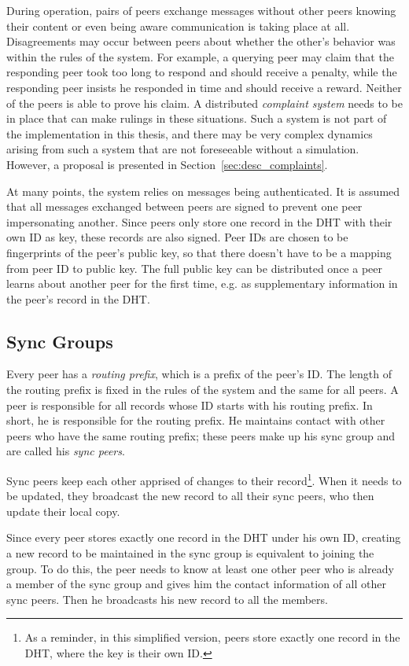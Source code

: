 During operation, pairs of peers exchange messages without other peers knowing
their content or even being aware communication is taking place at all.
Disagreements may occur between peers about whether the other's behavior was
within the rules of the system. For example, a querying peer may claim that the
responding peer took too long to respond and should receive a penalty, while the
responding peer insists he responded in time and should receive a reward.
Neither of the peers is able to prove his claim. A distributed \emph{complaint
system} needs to be in place that can make rulings in these situations. Such a
system is not part of the implementation in this thesis, and there may be very
complex dynamics arising from such a system that are not foreseeable without a
simulation. However, a proposal is presented in
Section~\ref{sec:desc_complaints}.

At many points, the system relies on messages being authenticated. It is assumed
that all messages exchanged between peers are signed to prevent one peer
impersonating another. Since peers only store one record in the DHT with their
own ID as key, these records are also signed. Peer IDs are chosen to be
fingerprints of the peer's public key, so that there doesn't have to be a
mapping from peer ID to public key. The full public key can be distributed once
a peer learns about another peer for the first time, e.g. as supplementary
information in the peer's record in the DHT.

\subsection{Sync Groups}
\label{sec:desc_sync_groups}
Every peer has a \emph{routing prefix}, which is a prefix of the peer's ID. The
length of the routing prefix is fixed in the rules of the system and the same
for all peers. A peer is responsible for all records whose ID starts with his
routing prefix. In short, he is responsible for the routing prefix. He maintains
contact with other peers who have the same routing prefix; these peers make up
his sync group and are called his \emph{sync peers}.

Sync peers keep each other apprised of changes to their record\footnote{As a
reminder, in this simplified version, peers store exactly one record in the DHT,
where the key is their own ID.}. When it needs to be updated, they broadcast the
new record to all their sync peers, who then update their local copy.

Since every peer stores exactly one record in the DHT under his own ID, creating
a new record to be maintained in the sync group is equivalent to joining the
group. To do this, the peer needs to know at least one other peer who is already
a member of the sync group and gives him the contact information of all other
sync peers. Then he broadcasts his new record to all the members.

